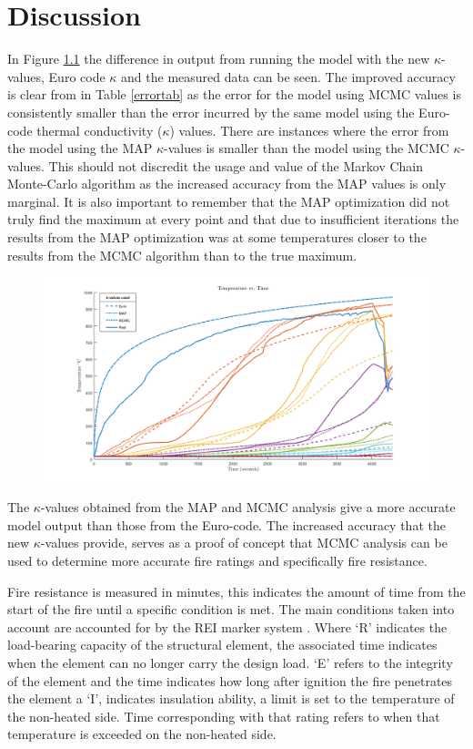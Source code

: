 \chapter{Discussion} \label{discussion}
In Figure \ref{data_newk} the difference in output from running the model with the new $\kappa$-values, Euro code $\kappa$ and the measured data can be seen. 
The improved accuracy is clear from in Table \ref{errortab} as the error for the model using MCMC values is consistently smaller than the error incurred by the same model using the Euro-code thermal conductivity ($\kappa$) values.
There are instances where the error from the model using the MAP $\kappa$-values is smaller than the model using the MCMC $\kappa$-values. 
This should not discredit the usage and value of the Markov Chain Monte-Carlo algorithm as the increased accuracy from the MAP values is only marginal.
It is also important to remember that the MAP optimization did not truly find the maximum at every point and that due to insufficient iterations the results from the MAP optimization was at some temperatures closer to the results from the MCMC algorithm than to the true maximum.

\begin{figure}
	\label{data_newk}
	\centering
	\includegraphics[width=\textwidth,]{figures/final_graph.png}
\end{figure}
The $\kappa$-values obtained from the MAP and MCMC analysis give a more accurate model output than those from the Euro-code.
The increased accuracy that the new $\kappa$-values provide, serves as a proof of concept that MCMC analysis can be used to determine more accurate fire ratings and specifically fire resistance. 

Fire resistance is measured in minutes, this indicates the amount of time from the start of the fire until a specific condition is met. 
The main conditions taken into account are accounted for by the REI marker system \citep{rei:2021}. 
Where `R' indicates the load-bearing capacity of the structural element, the associated time indicates when the element can no longer carry the design load.
`E' refers to the integrity of the element and the time indicates how long after ignition the fire penetrates the element a `I', indicates insulation ability, a limit is set to the temperature of the non-heated side.
Time corresponding with that rating refers to when that temperature is exceeded on the non-heated side.

